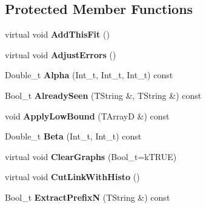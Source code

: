 \subsection*{Protected Member Functions}
\begin{DoxyCompactItemize}
\item 
\hypertarget{classTSplineFit_a531edbf4c66f3c4cf34467e1019c8645}{virtual void {\bfseries Add\-This\-Fit} ()}\label{classTSplineFit_a531edbf4c66f3c4cf34467e1019c8645}

\item 
\hypertarget{classTSplineFit_a8347d1a602b8a74fdf1494ce09e7ab8b}{virtual void {\bfseries Adjust\-Errors} ()}\label{classTSplineFit_a8347d1a602b8a74fdf1494ce09e7ab8b}

\item 
\hypertarget{classTSplineFit_af4cc40c338ba305c811772b0c54fa17b}{Double\-\_\-t {\bfseries Alpha} (Int\-\_\-t, Int\-\_\-t, Int\-\_\-t) const }\label{classTSplineFit_af4cc40c338ba305c811772b0c54fa17b}

\item 
\hypertarget{classTSplineFit_a39b93378e479fd3bc3d3870a8ddbf0e4}{Bool\-\_\-t {\bfseries Already\-Seen} (T\-String \&, T\-String \&) const }\label{classTSplineFit_a39b93378e479fd3bc3d3870a8ddbf0e4}

\item 
\hypertarget{classTSplineFit_a9bf2c78bdee9ec88490e2df0e23fbbc1}{void {\bfseries Apply\-Low\-Bound} (T\-Array\-D \&) const }\label{classTSplineFit_a9bf2c78bdee9ec88490e2df0e23fbbc1}

\item 
\hypertarget{classTSplineFit_a2f7b3e4cea0157fe1b8d50046c5d2820}{Double\-\_\-t {\bfseries Beta} (Int\-\_\-t, Int\-\_\-t) const }\label{classTSplineFit_a2f7b3e4cea0157fe1b8d50046c5d2820}

\item 
\hypertarget{classTSplineFit_a40d2f5ffe69807f212d3321ac1325428}{virtual void {\bfseries Clear\-Graphs} (Bool\-\_\-t=k\-T\-R\-U\-E)}\label{classTSplineFit_a40d2f5ffe69807f212d3321ac1325428}

\item 
\hypertarget{classTSplineFit_ae4145cfd4e0a0a996ed0369129db8d99}{virtual void {\bfseries Cut\-Link\-With\-Histo} ()}\label{classTSplineFit_ae4145cfd4e0a0a996ed0369129db8d99}

\item 
\hypertarget{classTSplineFit_ab1d1d7867ef9a33449d29d86f80b3c18}{Bool\-\_\-t {\bfseries Extract\-Prefix\-N} (T\-String \&) const }\label{classTSplineFit_ab1d1d7867ef9a33449d29d86f80b3c18}


\end{DoxyCompactItemize}
